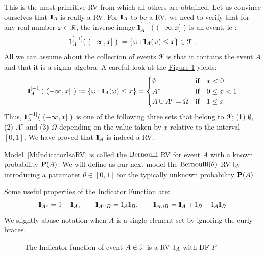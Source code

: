 \begin{model}\label{M:IndicatorIsaRV}
This is the most primitive RV from which all others are obtained. 
Let us convince ourselves that ${1}\mspace{-11 mu}{1}_A$ is really a RV.  For ${1}\mspace{-11 mu}{1}_A$ to be a RV, we need to verify that 
for any real number $x \in \mathbb{R}$, the inverse image $\BB{1}_A^{[-1]}( \ (- \infty, x] \ )$ is an event, ie :
\[
{1}\mspace{-11 mu}{1}_A^{[-1]}( \ (- \infty, x] \ ) := \{\omega: {1}\mspace{-11 mu}{1}_A(\omega) \leq x\} \in \mathcal{F} \ .
\] 
All we can assume about the collection of events $\mathcal{F}$ is that it contains the event $A$ and that it is a sigma algebra.  A careful look at the \hyperref[F:RVIndic]{Figure \ref*{F:RVIndic}} yields:
\begin{equation}
{1}\mspace{-11 mu}{1}_A^{[-1]}( \ (- \infty, x] \ ) := \{\omega: {1}\mspace{-11 mu}{1}_A(\omega) \leq x\} =
\begin{cases}
\emptyset & \text{if} \quad x < 0 \notag \\
A^c       & \text{if} \quad 0 \leq x < 1 \notag \\
A \cup A^c  = \Omega   & \text{if} \quad 1 \leq x  \notag 
\end{cases}
\end{equation}
Thus, $\BB{1}_A^{[-1]}( \ (- \infty, x] \ )$ is one of the following three sets that belong to $\mathcal{F}$; (1) $\emptyset$, (2) $A^c$ and (3) $\Omega$ depending on the value taken by $x$ relative to the interval $[0,1]$.  We have proved that ${1}\mspace{-11 mu}{1}_A$ is indeed a RV.

Model~\ref{M:IndicatorIsaRV} is called the $\mbox{{\rm Bernoulli}}$ RV for event $A$ with a known probability $\mathbf{P}(A)$. We will define as our next model the $\mbox{{\rm Bernoulli}}(\theta)$ RV by introducing a paramater $\theta \in [0,1]$ for the typically unknown probability $\mathbf{P}(A)$. 
\end{model}

Some useful properties of the Indicator Function are:
\[
\BB{1}_{A^c} = 1 - \BB{1}_A, \qquad \BB{1}_{A \cap B} = \BB{1}_A \BB{1}_B, \qquad \BB{1}_{A \cup B} = \BB{1}_A + \BB{1}_B - \BB{1}_A \BB{1}_B
\]
We slightly abuse notation when $A$ is a single element set by ignoring the curly braces.

\begin{figure}[htpb]
\caption{The Indicator function of event $A \in \mathcal{F}$ is a RV ${1}\mspace{-11 mu}{1}_A$ with DF $F$ \label{F:RVIndic}}
\centering   {}
\end{figure}

